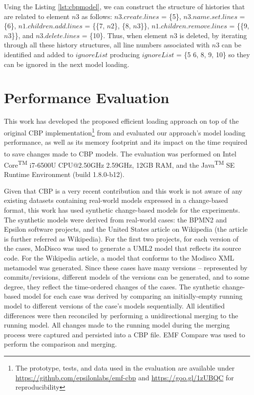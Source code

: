 {Using the Listing \ref{lst:cbpmodel}, we can construct the structure of histories that are related to element $n3$ as follows: $n3$.$create$.$lines$ = \{5\}, $n3$.$name$.$set$.$lines$ = \{6\}, $n1$.$children$.$add$.$lines$ = \{\{7, $n2$\}, \{8, $n3$\}\}, $n1$.$children$.$remove$.$lines$ = \{\{9, $n3$\}\}, and $n3$.$delete$.$lines$ = \{10\}. Thus, when element $n3$ is deleted, by iterating through all these history structures, all line numbers associated with $n3$ can be identified and added to $ignoreList$ producing $ignoreList$ = \{5 6, 8, 9, 10\} so they can be ignored in the next model loading.

\section{Performance Evaluation}
\label{sec:performance_evaluation}

This work has developed the proposed efficient loading approach on top of the original CBP implementation\footnote{The prototype, tests, and data used in the evaluation are available under \url{https://github.com/epsilonlabs/emf-cbp} and \url{https://goo.gl/1zUBQC} for reproducibility} from \cite{yohannis2017turning} and evaluated our approach's model loading performance, as well as its memory footprint and its impact on the time required to save changes made to CBP models. The evaluation was performed on Intel\textsuperscript{\textregistered} Core\textsuperscript{TM} i7-6500U CPU@2.50GHz 2.59GHz, 12GB RAM, and the Java\textsuperscript{TM} SE Runtime Environment (build 1.8.0-b12).

Given that CBP is a very recent contribution and this work is not aware of any existing datasets containing real-world models expressed in a change-based format, this work has used synthetic change-based models for the experiments. The synthetic models were derived from real-world cases: the BPMN2 \cite{eclipse2017bpmn2,eclipse2018bpmn2git} and Epsilon \cite{eclipse2017epsilon,eclipse2018epsilongit} software projects, and the United States article \cite{wikipedia2018us} on Wikipedia (the article is further referred as Wikipedia). For the first two projects, for each version of the cases, MoDisco \cite{DBLP:journals/infsof/BruneliereCDM14} was used to generate a UML2 \cite{eclipse2017uml2} model that reflects its source code. For the Wikipedia article, a model that conforms to the Modisco XML metamodel \cite{eclipse2018modiscoxml} was generated. Since these cases have many versions -- represented by commits/revisions, different models of the versions can be generated, and to some degree, they reflect the time-ordered changes of the cases. The synthetic change-based model for each case was derived by comparing an initially-empty running model to different versions of the case's models sequentially. All identified differences were then reconciled by performing a unidirectional merging to the running model. All changes made to the running model during the merging process were captured and persisted into a CBP file. EMF Compare was used \cite{eclipse2017compare} to perform the comparison and merging.

}
